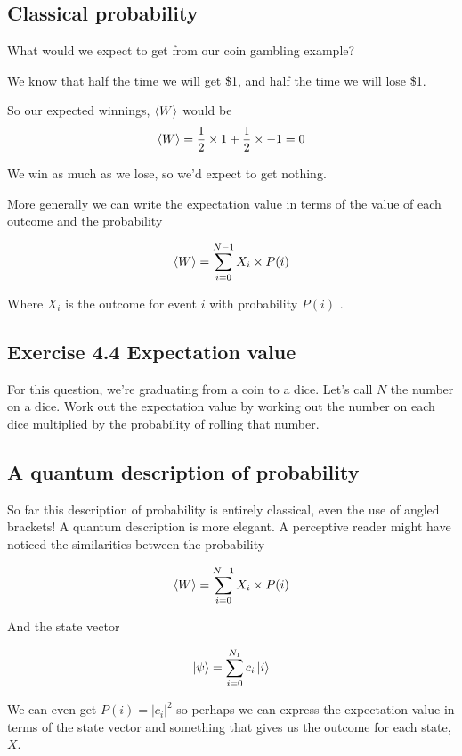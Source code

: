 \documentclass{book}
\begin{document}
\subsection{ Classical probability }

What would we expect to get from our coin gambling example? 

We know that half the time we will get \$1, and half the time we will lose \$1. 

So our expected winnings, $\braket{W}$ would be
$$
\braket{W} = \frac{1}{2} \times 1 + \frac{1}{2} \times -1 
=0
$$

We win as much as we lose, so we'd expect to get nothing. 

More generally we can write the expectation value in terms of the value of each outcome and the probability 

$$ \braket{W} = \sum_{i = 0}^{N-1} X_i \times P(i) $$

Where $X_i$ is the outcome for event $i$ with probability $P(i)$ . 

\hline 
\subsection{Exercise 4.4 Expectation value}  
  
For this question, we're graduating from a coin to a dice. Let's call $N$ the number on a dice. Work out the expectation value by working out the number on each dice multiplied by the probability of rolling that number. \newline

\hline

\subsection{ A quantum description of probability }

So far this description of probability is entirely classical, even the use of angled brackets! A quantum description is more elegant. A perceptive reader might have noticed the similarities between the probability

$$ \braket{W} = \sum_{i = 0}^{N-1} X_i \times P(i) $$

And the state vector

$$
\ket{\psi} = \sum_{i = 0}^{N_1} c_i \ket{i}
$$ 

We can even get $P(i) = |c_i|^2$ so perhaps we can express the expectation value in terms of the state vector and something that gives us the outcome for each state,$X$. 
\end{document}

